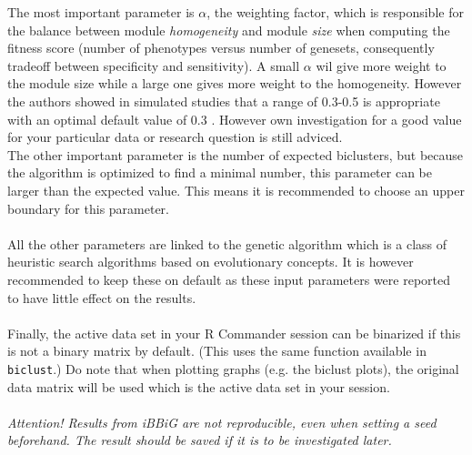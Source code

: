 \documentclass[a4paper]{article}\usepackage[]{graphicx}\usepackage[]{color}
\begin{document}
\noindent The most important parameter is $\alpha$, the weighting factor, which
is responsible for the balance between module {\it homogeneity} and module
{\it size} when computing the fitness score (number of phenotypes versus number
of genesets, consequently tradeoff between specificity and sensitivity). A small
$\alpha$ wil give more weight to the module size while a large one gives more
weight to the homogeneity. However the authors showed in simulated studies that
a range of 0.3-0.5 is appropriate with an optimal default value of 0.3
\citep{Gustenleitner2012}. However own investigation for a good value for your
particular data or research question is still adviced.\\
The other important parameter is the number of expected biclusters, but because
the algorithm is optimized to find a minimal number, this parameter can be larger
than the expected value. This means it is recommended to choose an upper
boundary for this parameter.
\\ \\
All the other parameters are linked to the genetic algorithm which is a class of
heuristic search algorithms based on evolutionary concepts. It is however
recommended to keep these on default as these input parameters were reported to
have little effect on the results. 
\\ \\
Finally, the active data set in your R Commander session can be binarized if
this is not a binary matrix by default. (This uses the same function available
in \verb|biclust|.) Do note that when plotting graphs (e.g. the biclust plots),
the original data matrix will be used which is the active data set in your
session.
\\ \\
{\it Attention! Results from iBBiG are not reproducible, even when setting a
seed beforehand. The result should be saved if it is to be investigated later.} 
\end{document}
